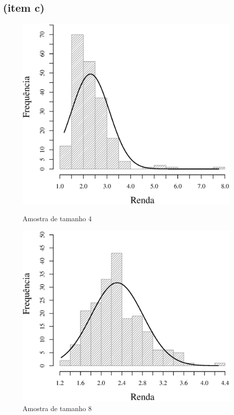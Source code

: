 \subsection{(item c)}

\begin{figure}[h]
\begin{minipage}{0.50\textwidth}
	\includegraphics[width=\linewidth]{plots/histogram_renda_n4.eps}
	\caption{Amostra de tamanho 4}
	\label{fig:m8}
\end{minipage}
\begin{minipage}{0.50\textwidth}
	\includegraphics[width=\linewidth]{plots/histogram_renda_n8.eps}
	\caption{Amostra de tamanho 8}
	\label{fig:m8}
\end{minipage}
\end{figure}

